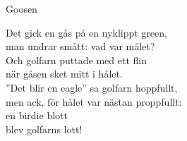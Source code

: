 \begin{song}{Goosen}
	
	
	
	
	Det gick en gås på en nyklippt green,\\
	man undrar smått: vad var målet?\\
	Och golfarn puttade med ett flin\\
	när gåsen sket mitt i hålet.\\
	”Det blir en eagle” sa golfarn hoppfullt,\\
	men ack, för hålet var nästan proppfullt:\\
	en birdie blott\\
	blev golfarns lott!
	
\end{song}
